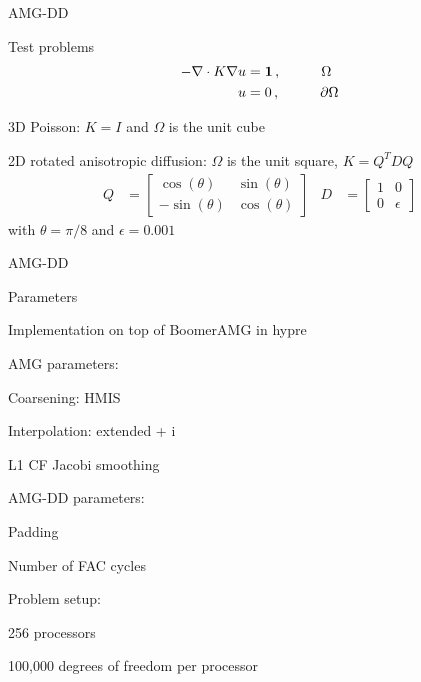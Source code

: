 \documentclass[18pt,xcolor=table]{beamer}
\begin{document}
\begin{frame}{AMG-DD}
\begin{block}{Test problems}
\begin{align*}
-\nabla \cdot K \nabla u &= \mathbf{1}\,, \hspace{1 cm} \Omega \\
u &= 0\,, \hspace{1 cm} \partial \Omega
\end{align*}
\bit
\item 3D Poisson: $K = I$ and $\Omega$ is the unit cube
\item 2D rotated anisotropic diffusion: $\Omega$ is the unit square, $K = Q^TDQ$
\eit
\begin{align*}
Q &= \begin{bmatrix}
\cos(\theta) & \sin(\theta) \\
-\sin(\theta) & \cos(\theta)
\end{bmatrix}
&
D &= \begin{bmatrix}
1 & 0\\
0 & \epsilon
\end{bmatrix}
\end{align*}
with $\theta=\pi/8$ and $\epsilon=0.001$
\end{block}
\end{frame}

\begin{frame}{AMG-DD}
\begin{block}{Parameters}
\bit
\item Implementation on top of BoomerAMG in hypre
\item AMG parameters:
\bit
   \item Coarsening: HMIS
   \item Interpolation: extended + i
   \item L1 CF Jacobi smoothing
\eit
\item AMG-DD parameters:
\bit
   \item Padding
   \item Number of FAC cycles
\eit
\item Problem setup:
\bit
   \item 256 processors
   \item 100,000 degrees of freedom per processor
\eit
\eit
\end{block}
\end{frame}
\end{document}
